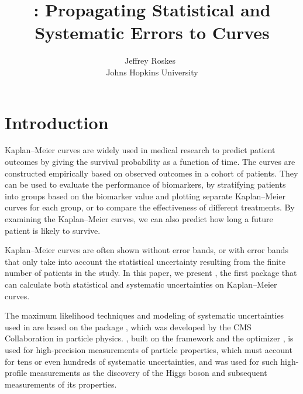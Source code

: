 \documentclass[article]{jss}
\author{Jeffrey Roskes~\orcidlink{0000-0001-8761-0490}\\Johns Hopkins University} %
\title{\pkg{KoMbine}: Propagating Statistical and Systematic Errors to \KM{} Curves}
\newcommand{\KM}{Kaplan--Meier} %
\begin{document}


\section{Introduction}\label{sec:intro}

\KM{} curves are widely used in medical research to predict patient outcomes by giving the survival probability as a function of time. The curves are constructed empirically based on observed outcomes in a cohort of patients. They can be used to evaluate the performance of biomarkers, by stratifying patients into groups based on the biomarker value and plotting separate \KM{} curves for each group, or to compare the effectiveness of different treatments. By examining the \KM{} curves, we can also predict how long a future patient is likely to survive.

\KM{} curves are often shown without error bands, or with error bands that only take into account the statistical uncertainty resulting from the finite number of patients in the study. In this paper, we present , the first package that can calculate both statistical and systematic uncertainties on \KM{} curves.

The maximum likelihood techniques and modeling of systematic uncertainties used in  are based on the  package \citep{CAT-23-001}, which was developed by the CMS Collaboration in particle physics\@. , built on the  framework \citep{RooFit} and the  optimizer \citep{minuit}, is used for high-precision measurements of particle properties, which must account for tens or even hundreds of systematic uncertainties, and was used for such high-profile measurements as the discovery of the Higgs boson \citep{HIG-12-028} and subsequent measurements of its properties.
\end{document}
